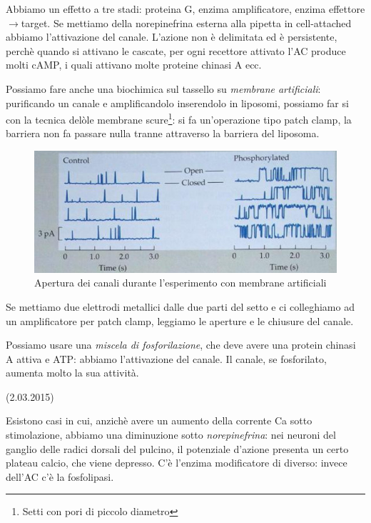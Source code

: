 \documentclass[a4paper,12pt]{article}
\newcommand{\lfreccia}{\ensuremath{\longrightarrow}}
\begin{document}
Abbiamo un effetto a tre stadi: proteina G, enzima amplificatore, enzima effettore \lfreccia target. Se mettiamo della norepinefrina esterna alla pipetta in cell-attached abbiamo l'attivazione del canale. L'azione non è delimitata ed è persistente, perchè quando si attivano le cascate, per ogni recettore attivato l'AC produce molti cAMP, i quali attivano molte proteine chinasi A ecc.

Possiamo fare anche una biochimica sul tassello su \emph{membrane artificiali}: purificando un canale e amplificandolo inserendolo in liposomi, possiamo far si con la tecnica delòle membrane scure\footnote{Setti con pori di piccolo diametro}: si fa un'operazione tipo patch clamp, la barriera non fa passare nulla tranne attraverso la barriera del liposoma. 

\begin{figure}[H]
\centering
\includegraphics[scale=0.4]{immagine/membrane.jpg}
\caption{Apertura dei canali durante l'esperimento con membrane artificiali}
\end{figure} 

Se mettiamo due elettrodi metallici dalle due parti del setto e ci colleghiamo ad un amplificatore per patch clamp, leggiamo le aperture e le chiusure del canale.

Possiamo usare una \emph{miscela di fosforilazione}, che deve avere una protein chinasi A attiva e ATP: abbiamo l'attivazione del canale. Il canale, se fosforilato, aumenta molto la sua attività.
	
(2.03.2015)

Esistono casi in cui, anzichè avere un aumento della corrente Ca sotto stimolazione, abbiamo una diminuzione sotto \emph{norepinefrina}: nei neuroni del ganglio delle radici dorsali del pulcino, il potenziale d'azione presenta un certo plateau calcio, che viene depresso. C'è l'enzima modificatore di diverso: invece dell'AC c'è la fosfolipasi.
\end{document}

